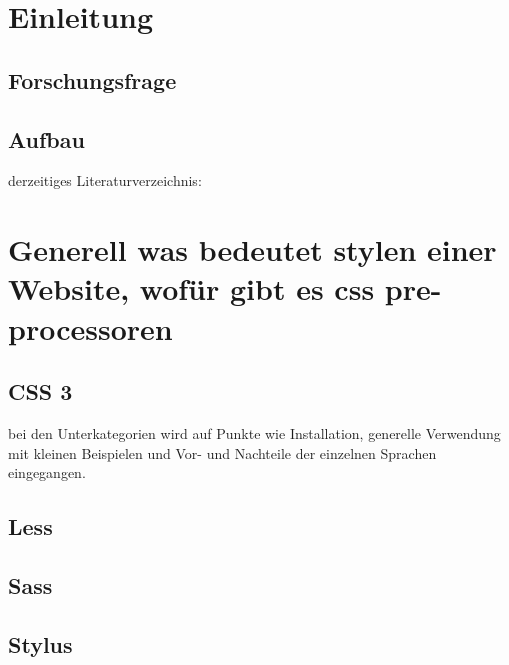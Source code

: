 \section{Einleitung}
\label{section:Introduction}


\subsection{Forschungsfrage}
\label{subsection:Coding}


\subsection{Aufbau}
derzeitiges Literaturverzeichnis:\newline
\autocite[]{Bracey.2014}\newline
\autocite[]{Coyier.2012}\newline
\autocite[]{Croom.2012}\newline
\autocite[]{Firdaus.}\newline
\autocite[]{Hixon.2011}\newline
\autocite[]{Page.2013}\newline
\autocite[]{ZingDesign.2014}\newline


\section{Generell was bedeutet stylen einer Website, wofür gibt es css pre-processoren}
\label{section:MathematicalStuff}



\subsection{CSS 3}
bei den Unterkategorien wird auf Punkte wie Installation, generelle Verwendung mit kleinen Beispielen und Vor- und Nachteile der einzelnen Sprachen eingegangen.

\subsection{Less}

\subsection{Sass}

\subsection{Stylus}

